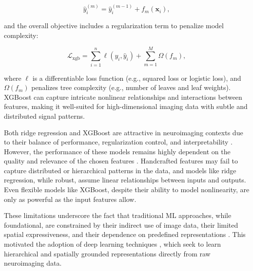 \begin{equation}
    \hat{y}_i^{(m)} = \hat{y}_i^{(m-1)} + f_m(\mathbf{x}_i),
\end{equation}

and the overall objective includes a regularization term to penalize model complexity:

\begin{equation}
    \mathcal{L}_{\text{xgb}} = \sum_{i=1}^n \ell(y_i, \hat{y}_i) + \sum_{m=1}^M \Omega(f_m),
\end{equation}

where $\ell$ is a differentiable loss function (e.g., squared loss or logistic loss), and $\Omega(f_m)$ penalizes tree complexity (e.g., number of leaves and leaf weights). XGBoost can capture intricate nonlinear relationships and interactions between features, making it well-suited for high-dimensional imaging data with subtle and distributed signal patterns.

Both ridge regression and XGBoost are attractive in neuroimaging contexts due to their balance of performance, regularization control, and interpretability \cite{Rokem2020-vj,Yi2023-ak}. However, the performance of these models remains highly dependent on the quality and relevance of the chosen features \cite{Mwangi2014-nl}. Handcrafted features may fail to capture distributed or hierarchical patterns in the data, and models like ridge regression, while robust, assume linear relationships between inputs and outputs. Even flexible models like XGBoost, despite their ability to model nonlinearity, are only as powerful as the input features allow.

These limitations underscore the fact that traditional ML approaches, while foundational, are constrained by their indirect use of image data, their limited spatial expressiveness, and their dependence on predefined representations \cite{Varoquaux2022-as,Mwangi2014-nl}. This motivated the adoption of deep learning techniques \cite{Sarker2021-fo}, which seek to learn hierarchical and spatially grounded representations directly from raw neuroimaging data.

